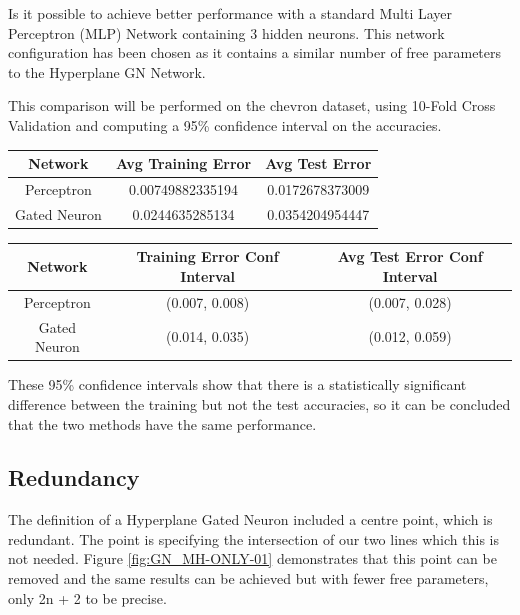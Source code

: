 \documentclass[notitlepage]{report}
\theoremstyle{definition}
\begin{document}
Is it possible to achieve better performance with a standard Multi Layer Perceptron (MLP) Network containing 3 hidden neurons. This network configuration has been chosen as it contains a similar number of free parameters to the Hyperplane GN Network.

This comparison will be performed on the chevron dataset, using 10-Fold Cross Validation and computing a 95\% confidence interval on the accuracies.

\begin{center}
\begin{tabular}{| c | c | c |}
\hline
Network & Avg Training Error & Avg Test Error \\
\hline
\hline
Perceptron & 0.00749882335194 & 0.0172678373009 \\
\hline
Gated Neuron & 0.0244635285134 & 0.0354204954447 \\
\hline
\end{tabular}
\end{center}

\begin{center}
\begin{tabular}{| c | c | c |}
\hline
Network & Training Error Conf Interval & Avg Test Error Conf Interval\\
\hline
\hline
Perceptron & (0.007, 0.008) & (0.007, 0.028)\\
\hline
Gated Neuron & (0.014, 0.035) & (0.012, 0.059)\\
\hline
\end{tabular}
\end{center}

These 95\% confidence intervals show that there is a statistically significant difference between the training but not the test accuracies, so it can be concluded that the two methods have the same performance.

\subsection{Redundancy}
The definition of a Hyperplane Gated Neuron included a centre point, which is redundant. The point is specifying the intersection of our two lines which this is not needed. Figure \ref{fig:GN_MH-ONLY-01} demonstrates that this point can be removed and the same results can be achieved but with fewer free parameters, only 2n + 2 to be precise.
\end{document}
